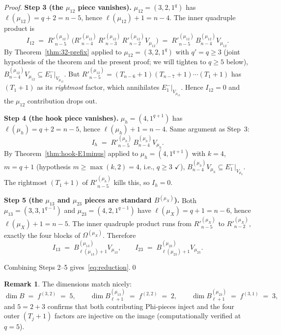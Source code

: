 \documentclass[11pt]{article}
\theoremstyle{definition}
\newtheorem{remark}[theorem]{Remark}
\newcommand{\Om}{\Omega}
\newcommand{\Rp}{{R'}}
\begin{document}
\begin{proof}
\medskip\textbf{Step 3 (the $\mu_{12}$ piece vanishes).}
$\mu_{12} = (3, 2, 1^q)$ has $\ell(\mu_{12}) = q + 2 = n - 5$, hence
$\ell(\mu_{12}) + 1 = n - 4$.  The inner quadruple product is
\[
   I_{12} \;=\; \Rp_{n-5}^{(\mu_{12})}\,\bigl(\Rp_{n-4}^{(\mu_{12})}\,
   \Rp_{n-3}^{(\mu_{12})}\,\Rp_{n-2}^{(\mu_{12})} V_{\mu_{12}}\bigr)
   \;=\; \Rp_{n-5}^{(\mu_{12})}\,B^{(\mu_{12})}_{n-4} V_{\mu_{12}}.
\]
By Theorem~\ref{thm:32-prefix} applied to $\mu_{12} = (3, 2, 1^{q})$
with $q' = q \ge 3$ (joint hypothesis of the theorem and the present
proof; we will tighten to $q \ge 5$ below),
$B^{(\mu_{12})}_{n-4} V_{\mu_{12}} \subseteq E_1^-|_{V_{\mu_{12}}}$.
But $\Rp_{n-5}^{(\mu_{12})} = (T_{n-6}+1)(T_{n-7}+1)\cdots(T_1+1)$ has
$(T_1+1)$ as its \emph{rightmost} factor, which annihilates
$E_1^-|_{V_{\mu_{12}}}$.  Hence $I_{12} = 0$ and the $\mu_{12}$
contribution drops out.

\medskip\textbf{Step 4 (the hook piece vanishes).}
$\mu_h = (4, 1^{q+1})$ has $\ell(\mu_h) = q + 2 = n - 5$, hence
$\ell(\mu_h) + 1 = n - 4$.  Same argument as Step~3:
\[
   I_h \;=\; \Rp_{n-5}^{(\mu_h)}\,B^{(\mu_h)}_{n-4} V_{\mu_h}.
\]
By Theorem~\ref{thm:hook-E1minus} applied to $\mu_h = (4, 1^{q+1})$
with $k = 4$, $m = q + 1$ (hypothesis $m \ge \max(k, 2) = 4$, i.e.,
$q \ge 3$ $\checkmark$),
$B^{(\mu_h)}_{n-4} V_{\mu_h} \subseteq E_1^-|_{V_{\mu_h}}$.  The
rightmost $(T_1+1)$ of $\Rp_{n-5}^{(\mu_h)}$ kills this, so $I_h = 0$.

\medskip\textbf{Step 5 (the $\mu_{13}$ and $\mu_{23}$ pieces are
standard $B^{(\mu_X)}$).}  Both $\mu_{13} = (3, 3, 1^{q-1})$ and
$\mu_{23} = (4, 2, 1^{q-1})$ have $\ell(\mu_X) = q + 1 = n - 6$, hence
$\ell(\mu_X) + 1 = n - 5$.  The inner quadruple product runs from
$\Rp^{(\mu_X)}_{n-5}$ to $\Rp^{(\mu_X)}_{n-2}$, exactly the four blocks
of $\Om^{(\mu_X)}$.  Therefore
\[
   I_{13} \;=\; B^{(\mu_{13})}_{\ell(\mu_{13})+1} V_{\mu_{13}},
   \qquad
   I_{23} \;=\; B^{(\mu_{23})}_{\ell(\mu_{23})+1} V_{\mu_{23}}.
\]

Combining Steps 2--5 gives~\eqref{eq:reduction}.\qed
\end{proof}

\begin{remark}\label{rem:dim-add}
The dimensions match nicely:
\[
   \dim B \;=\; f^{(3, 2)} \;=\; 5,
   \qquad
   \dim B^{(\mu_{13})}_{\ell+1} \;=\; f^{(2,2)} \;=\; 2,
   \qquad
   \dim B^{(\mu_{23})}_{\ell+1} \;=\; f^{(3,1)} \;=\; 3,
\]
and $5 = 2 + 3$ confirms that both contributing Phi-pieces inject and
the four outer $(T_j+1)$ factors are injective on the image (computationally
verified at $q = 5$).
\end{remark}
\end{document}
